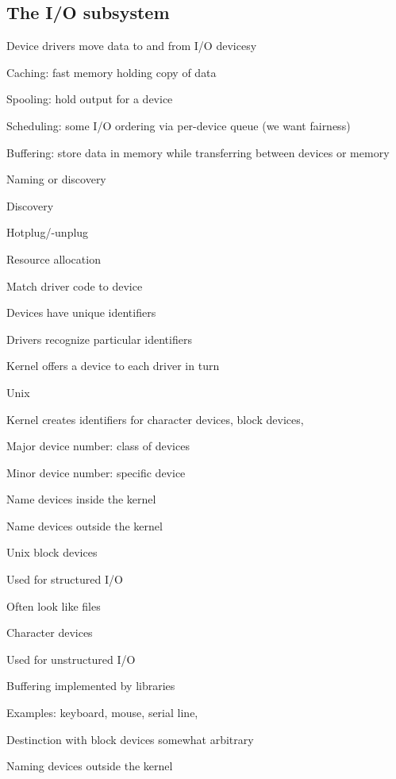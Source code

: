 \subsection{The I/O subsystem}
\enumstart
	\item Device drivers move data to and from I/O devicesy
	\item Caching: fast memory holding copy of data
	\item Spooling: hold output for a device
	\item Scheduling: some I/O ordering via per-device queue (we want fairness)
	\item Buffering: store data in memory while transferring between devices or memory
	\item Naming or discovery
	\enumstart
		\item Discovery
		\item Hotplug/-unplug
		\item Resource allocation
		\item Match driver code to device
		\enumstart
			\item Devices have unique identifiers
			\item Drivers recognize particular identifiers
			\item Kernel offers a device to each driver in turn
			\item Unix
			\enumstart
				\item Kernel creates identifiers for character devices, block devices, \ddd
				\item Major device number: class of devices
				\item Minor device number: specific device
			\enumend
		\enumend
		\item Name devices inside the kernel
		\item Name devices outside the kernel
	\enumend
	\item Unix block devices
	\enumstart
		\item Used for structured I/O
		\item Often look like files
	\enumend
	\item Character devices
	\enumstart
		\item Used for unstructured I/O
		\item Buffering implemented by libraries
		\item Examples: keyboard, mouse, serial line, \ddd
		\item Destinction with block devices somewhat arbitrary
	\enumend
	\item Naming devices outside the kernel
